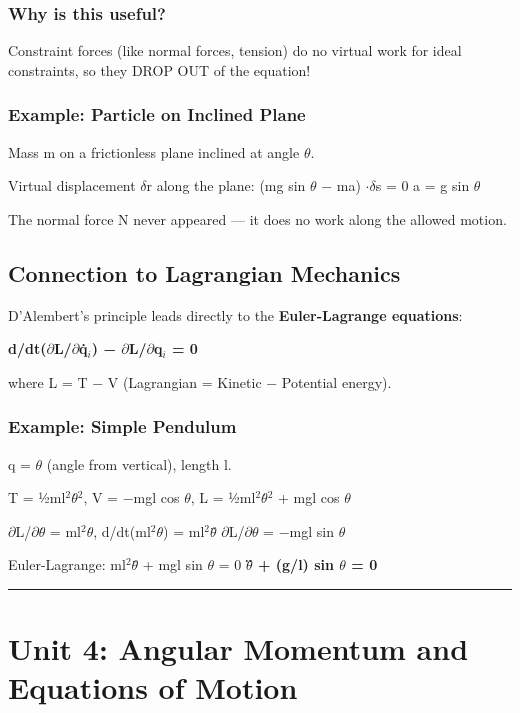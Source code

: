 \documentclass[12pt,a4paper,openany]{book}
\begin{document}
{{\subsubsection{ Why is this useful?}
Constraint forces (like normal forces, tension) do no virtual work for ideal constraints, so they DROP OUT of the equation!

\subsubsection{Example: Particle on Inclined Plane}
Mass m on a frictionless plane inclined at angle $\theta$.

Virtual displacement $\delta$r along the plane:
(mg sin $\theta$ − ma) $\cdot\delta$s = 0  a = g sin $\theta$ 

The normal force N never appeared — it does no work along the allowed motion.

\subsection{Connection to Lagrangian Mechanics }

D'Alembert's principle leads directly to the \textbf{Euler-Lagrange equations}:

\textbf{d/dt($\partial$L/$\partial$q̇$_i$) − $\partial$L/$\partial$q$_i$ = 0}

where L = T − V (Lagrangian = Kinetic − Potential energy).

\subsubsection{Example: Simple Pendulum}
q = $\theta$ (angle from vertical), length l.

T = ½ml$^2\theta$̇$^2$, V = −mgl cos $\theta$, L = ½ml$^2\theta$̇$^2$ + mgl cos $\theta$

$\partial$L/$\partial\theta$̇ = ml$^2\theta$̇, d/dt(ml$^2\theta$̇) = ml$^2\theta$̈
$\partial$L/$\partial\theta$ = −mgl sin $\theta$

Euler-Lagrange: ml$^2\theta$̈ + mgl sin $\theta$ = 0  \textbf{$\theta$̈ + (g/l) sin $\theta$ = 0} 

\bigskip\noindent\rule{\textwidth}{0.4pt}\bigskip

\section{Unit 4: Angular Momentum and Equations of Motion}

}}
\end{document}
